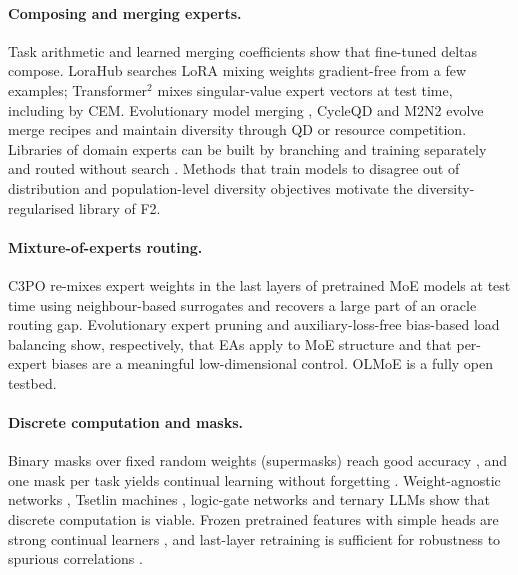 \documentclass[11pt,a4paper]{article}
\theoremstyle{definition}
\theoremstyle{plain}
\theoremstyle{remark}
\begin{document}
\paragraph{Composing and merging experts.}
Task arithmetic \cite{ilharco2023task} and learned merging coefficients \cite{yang2024adamerging} show that fine-tuned deltas compose. LoraHub \cite{huang2024lorahub} searches LoRA mixing weights gradient-free from a few examples; Transformer$^2$ \cite{sun2025transformer2} mixes singular-value expert vectors at test time, including by CEM. Evolutionary model merging \cite{akiba2025evomerge}, CycleQD \cite{kuroki2025cycleqd} and M2N2 \cite{abrantes2025m2n2} evolve merge recipes and maintain diversity through QD or resource competition. Libraries of domain experts can be built by branching and training separately \cite{li2022btm,sukhbaatar2024btx} and routed without search \cite{ostapenko2024arrow}. Methods that train models to disagree out of distribution \cite{lee2023divdis,pagliardini2023dbat} and population-level diversity objectives \cite{parkerholder2020dvd} motivate the diversity-regularised library of F2.

\paragraph{Mixture-of-experts routing.}
C3PO \cite{li2025c3po} re-mixes expert weights in the last layers of pretrained MoE models at test time using neighbour-based surrogates and recovers a large part of an oracle routing gap. Evolutionary expert pruning \cite{liu2024eep} and auxiliary-loss-free bias-based load balancing \cite{wang2024auxfree} show, respectively, that EAs apply to MoE structure and that per-expert biases are a meaningful low-dimensional control. OLMoE \cite{muennighoff2024olmoe} is a fully open testbed.

\paragraph{Discrete computation and masks.}
Binary masks over fixed random weights (supermasks) reach good accuracy \cite{zhou2019deconstructing,ramanujan2020hidden}, and one mask per task yields continual learning without forgetting \cite{wortsman2020supsup,masana2021ternary}. Weight-agnostic networks \cite{gaier2019wann}, Tsetlin machines \cite{granmo2018tsetlin}, logic-gate networks \cite{petersen2022logic} and ternary LLMs \cite{ma2024bitnet} show that discrete computation is viable. Frozen pretrained features with simple heads are strong continual learners \cite{zhou2023revisiting,mcdonnell2023ranpac,wang2022l2p}, and last-layer retraining is sufficient for robustness to spurious correlations \cite{kirichenko2023dfr}.
\end{document}
